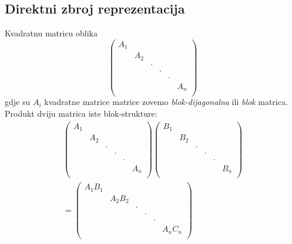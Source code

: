 \subsection*{Direktni zbroj reprezentacija}
Kvadratnu matricu oblika
\begin{displaymath}
   \begin{pmatrix}
        A_1 & & & & & \\
        & A_2 & & & &  \\
        & & \cdot & & & \\
        & & &  \cdot  & & \\
        & & & &  \cdot   & \\
        & & & &  & A_n  \\
   \end{pmatrix}
\end{displaymath}
gdje su $A_i$ kvadratne matrice matrice
zovemo \emph{blok-dijagonalna} ili \emph{blok} matrica.
Produkt dviju matrica iste blok-strukture:
\begin{multline*}
   \begin{pmatrix}
        A_1 & & & & & \\
        & A_2 & & & &  \\
        & & \cdot & & & \\
        & & &  \cdot  & & \\
        & & & &  \cdot   & \\
        & & & &  & A_n  \\
\end{pmatrix}
   \begin{pmatrix}
        B_1 & & & & & \\
        & B_2 & & & &  \\
        & & \cdot & & & \\
        & & &  \cdot  & & \\
        & & & &  \cdot   & \\
        & & & &  & B_n  \\
\end{pmatrix}
  \\[2ex]
   = \begin{pmatrix}
        A_1 B_1 & & & & & \\
        & A_2 B_2 & & & &  \\
        & & \cdot & & & \\
        & & &  \cdot  & & \\
        & & & &  \cdot   & \\
        & & & &  & A_n C_n  \\
\end{pmatrix}
\end{multline*}
